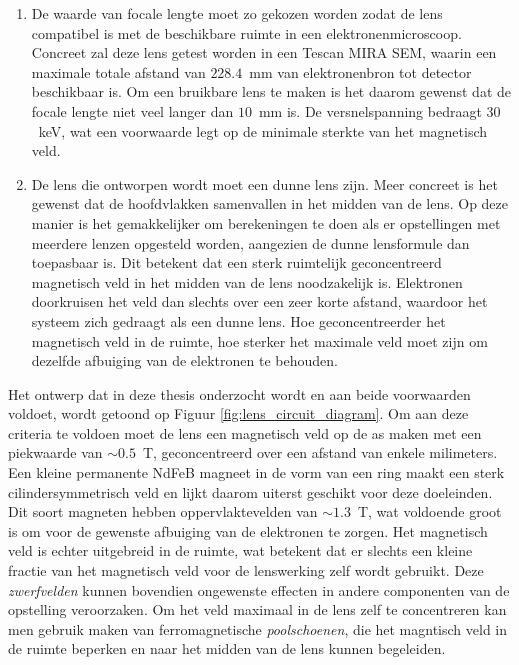 \documentclass[we,twoside,openright,a4paper,11pt]{uantwerpenbamathesis}
\begin{document}
\begin{enumerate}
    \item De waarde van focale lengte moet zo gekozen worden zodat de lens compatibel is met de beschikbare ruimte in een elektronenmicroscoop. Concreet zal deze lens getest worden in een Tescan MIRA SEM, waarin een maximale totale afstand van $228.4$~mm van elektronenbron tot detector beschikbaar is. Om een bruikbare lens te maken is het daarom gewenst dat de focale lengte niet veel langer dan $10$~mm is. De versnelspanning bedraagt $30$~keV, wat een voorwaarde legt op de minimale sterkte van het magnetisch veld. \\

    \item De lens die ontworpen wordt moet een dunne lens zijn. Meer concreet is het gewenst dat de hoofdvlakken samenvallen in het midden van de lens. Op deze manier is het gemakkelijker om berekeningen te doen als er opstellingen met meerdere lenzen opgesteld worden, aangezien de dunne lensformule dan toepasbaar is. Dit betekent dat een sterk ruimtelijk geconcentreerd magnetisch veld in het midden van de lens noodzakelijk is. Elektronen doorkruisen het veld dan slechts over een zeer korte afstand, waardoor het systeem zich gedraagt als een dunne lens. Hoe geconcentreerder het magnetisch veld in de ruimte, hoe sterker het maximale veld moet zijn om dezelfde afbuiging van de elektronen te behouden.\\
\end{enumerate}

Het ontwerp dat in deze thesis onderzocht wordt en aan beide voorwaarden voldoet, wordt getoond op Figuur \ref{fig:lens_circuit_diagram}. Om aan deze criteria te voldoen moet de lens een magnetisch veld op de as maken met een piekwaarde van $\sim0.5$~T, geconcentreerd over een afstand van enkele milimeters. Een kleine permanente NdFeB magneet in de vorm van een ring maakt een sterk cilindersymmetrisch veld en lijkt daarom uiterst geschikt voor deze doeleinden. Dit soort magneten hebben oppervlaktevelden van $\sim1.3$~T, wat voldoende groot is om voor de gewenste afbuiging van de elektronen te zorgen. Het magnetisch veld is echter uitgebreid in de ruimte, wat betekent dat er slechts een kleine fractie van het magnetisch veld voor de lenswerking zelf wordt gebruikt. Deze \textit{zwerfvelden} kunnen bovendien ongewenste effecten in andere componenten van de opstelling veroorzaken. Om het veld maximaal in de lens zelf te concentreren kan men gebruik maken van ferromagnetische \textit{poolschoenen}, die het magntisch veld in de ruimte beperken en naar het midden van de lens kunnen begeleiden.\\
\end{document}

